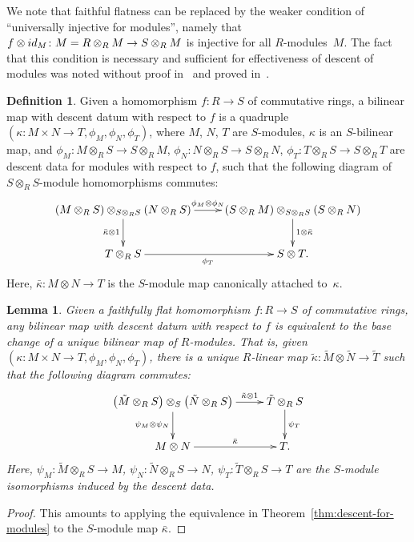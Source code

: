 \documentclass[11pt]{article}
\newtheorem{lem}[thm]{Lemma}
\theoremstyle{definition}
\newtheorem{defn}[thm]{Definition}
\begin{document}
We note that faithful flatness can be replaced by the weaker condition of ``universally injective for modules'', namely that $f \otimes {\rm id}_M\colon M = R \otimes_{R} M \to S \otimes_{R} M$ is injective for all $R$-modules~$M$. The fact that this condition is necessary and sufficient for effectiveness of descent of modules was noted without proof in~\cite{O70} and proved in~\cite{M00}.

\begin{defn}Given a homomorphism $f\colon R \to S$ of commutative rings, a bilinear map with descent datum with respect to $f$ is a quadruple $(\kappa\colon M \times N \to T, \phi_M, \phi_N, \phi_T)$, where $M$, $N$, $T$ are $S$-modules, $\kappa$ is an $S$-bilinear map, and $\phi_M\colon M \otimes_{R} S \to S \otimes_{R} M$, $\phi_N\colon N \otimes_{R} S \to S \otimes_{R} N$, $\phi_T\colon T \otimes_{R} S \to S \otimes_{R} T$ are descent data for modules with respect to $f$, such that the following diagram of $S \otimes_{R} S$-module homomorphisms commutes:
\begin{gather*} \xymatrix{ (M \otimes_{R} S)\otimes_{S \otimes_{R} S} (N \otimes_{R} S) \ar[r]^{\phi_M \otimes \phi_N} \ar[d]_{\bar{\kappa} \otimes 1} & (S \otimes_{R} M) \otimes_{S \otimes_{R} S} (S \otimes_{R} N) \ar[d]^{1 \otimes \bar{\kappa}} \\ T \otimes_{R} S \ar[r]_{\phi_T} & S \otimes T. } \end{gather*}
Here, $\bar{\kappa}\colon M \otimes N \to T$ is the $S$-module map canonically attached to~$\kappa$.
\end{defn}

\begin{lem} \label{lem:descent-for-bilinear-maps}
Given a faithfully flat homomorphism $f\colon R \to S$ of commutative rings, any bi\-li\-near map with descent datum with respect to $f$ is equivalent to the base change of a unique bilinear map of $R$-modules. That is, given $(\kappa\colon M \times N \to T, \phi_M, \phi_N, \phi_T)$, there is a unique $R$-linear map $\tilde{\kappa}\colon \tilde{M} \otimes \tilde{N} \to \tilde{T}$ such that the following diagram commutes:
\begin{gather*} \xymatrix{ \big(\tilde{M} \otimes_{R} S\big) \otimes_S \big(\tilde{N} \otimes_{R} S\big) \ar[r]^-{\tilde{\kappa} \otimes 1} \ar[d]_{\psi_M \otimes \psi_N} & \tilde{T} \otimes_{R} S \ar[d]^{\psi_T} \\
M \otimes N \ar[r]^-{\bar{\kappa}} & T. } \end{gather*}
Here, $\psi_M\colon \tilde{M} \otimes_{R} S \to M$, $\psi_N\colon \tilde{N} \otimes_{R} S \to N$, $\psi_T\colon \tilde{T} \otimes_{R} S \to T$ are the $S$-module isomorphisms induced by the descent data.
\end{lem}
\begin{proof}This amounts to applying the equivalence in Theorem~\ref{thm:descent-for-modules} to the $S$-module map $\bar{\kappa}$.
\end{proof}
\end{document}
